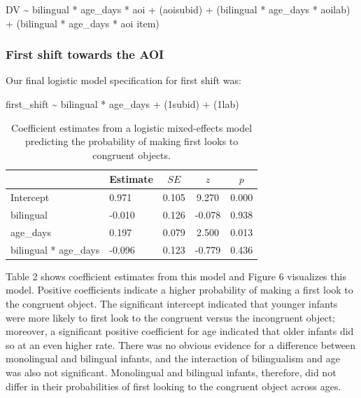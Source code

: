 \documentclass[,man,floatsintext]{apa6}
\begin{document}
DV \textasciitilde{} bilingual * age\_days * aoi +
(aoi\textbar{}subid) +
(bilingual * age\_days * aoi\textbar{}lab) +
(bilingual * age\_days * aoi \textbar{}item)

\hypertarget{first-shift-towards-the-aoi}{%
\subsubsection{First shift towards the AOI}\label{first-shift-towards-the-aoi}}

Our final logistic model specification for first shift was:

first\_shift \textasciitilde{} bilingual * age\_days +
(1\textbar{}subid) +
(1\textbar{}lab)

\begin{table}[tbp]
\begin{center}
\begin{threeparttable}
\caption{\label{tab:coef_table_firstshift}Coefficient estimates from a logistic mixed-effects model predicting the probability of making first looks to congruent objects.}
\begin{tabular}{llccc}
\toprule
 & Estimate & $SE$ & $z$ & $p$\\
\midrule
Intercept & 0.971 & 0.105 & 9.270 & 0.000\\
bilingual & -0.010 & 0.126 & -0.078 & 0.938\\
age\_days & 0.197 & 0.079 & 2.500 & 0.013\\
bilingual * age\_days & -0.096 & 0.123 & -0.779 & 0.436\\
\bottomrule
\end{tabular}
\end{threeparttable}
\end{center}
\end{table}

\noindent Table 2 shows coefficient estimates from this model and Figure 6 visualizes this model. Positive coefficients indicate a higher probability of making a first look to the congruent object. The significant intercept indicated that younger infants were more likely to first look to the congruent versus the incongruent object; moreover, a significant positive coefficient for age indicated that older infants did so at an even higher rate. There was no obvious evidence for a difference between monolingual and bilingual infants, and the interaction of bilingualism and age was also not significant. Monolingual and bilingual infants, therefore, did not differ in their probabilities of first looking to the congruent object across ages.
\end{document}
